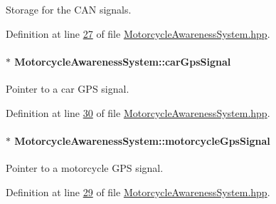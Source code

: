 Storage for the C\-A\-N signals. 



Definition at line \hyperlink{MotorcycleAwarenessSystem_8hpp_source_l00027}{27} of file \hyperlink{MotorcycleAwarenessSystem_8hpp_source}{Motorcycle\-Awareness\-System.\-hpp}.

\hypertarget{classMotorcycleAwarenessSystem_a9a8185e00b60d0be58bfa76166063128}{
\paragraph[{car\-Gps\-Signal}]{$\ast$ Motorcycle\-Awareness\-System\-::car\-Gps\-Signal\hspace{0.3cm}{\ttfamily [private]}}}\label{classMotorcycleAwarenessSystem_a9a8185e00b60d0be58bfa76166063128}


Pointer to a car G\-P\-S signal. 



Definition at line \hyperlink{MotorcycleAwarenessSystem_8hpp_source_l00030}{30} of file \hyperlink{MotorcycleAwarenessSystem_8hpp_source}{Motorcycle\-Awareness\-System.\-hpp}.

\hypertarget{classMotorcycleAwarenessSystem_ab281a3993b574923b2f379ed0477b2d4}{
\paragraph[{motorcycle\-Gps\-Signal}]{$\ast$ Motorcycle\-Awareness\-System\-::motorcycle\-Gps\-Signal\hspace{0.3cm}{\ttfamily [private]}}}\label{classMotorcycleAwarenessSystem_ab281a3993b574923b2f379ed0477b2d4}


Pointer to a motorcycle G\-P\-S signal. 



Definition at line \hyperlink{MotorcycleAwarenessSystem_8hpp_source_l00029}{29} of file \hyperlink{MotorcycleAwarenessSystem_8hpp_source}{Motorcycle\-Awareness\-System.\-hpp}.

